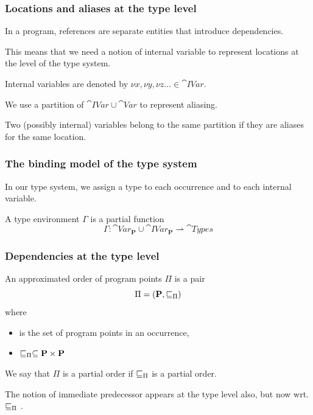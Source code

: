 \documentclass{beamer}
\begin{document}
 \begin{frame}
   \frametitle{Locations and aliases at the type level}

In a program, references are separate entities that introduce
dependencies.

This means that we need a notion of \alert{internal variable} to
represent locations at the level of the type system.

Internal variables are denoted by
$\nu x,\nu y, \nu z \ldots \in\cat{IVar}$.

We use a partition of $\cat{IVar} \cup \cat{Var}$ to represent
aliasing.

Two (possibly internal) variables belong to the same partition if they are
aliases for the same location.


 \end{frame}
 
 \begin{frame}
   \frametitle{The binding model of the type system}

   In our type system, we assign a type to each occurrence and to each
   internal variable.

   A type environment $\Gamma$ is a partial function
   \[
     \Gamma:\cat{Var}_{\mathbf{P}}\cup\cat{IVar}_{\mathbf{P}}\rightharpoonup\cat{Types} \]
   
 \end{frame}

 \begin{frame}
   \frametitle{Dependencies at the type level}

	An approximated order of program points $\Pi$ is a pair
	\[ \Pi=(\textbf{P},\sqsubseteq_\Pi) \]
	where
	\begin{itemize}
		\item {} is the set of program points in an occurrence,
		\item $\sqsubseteq_\Pi\subseteq\textbf{P}\times\textbf{P}$
	\end{itemize}
	We say that $\Pi$ is a partial order if $\sqsubseteq_\Pi$ is a partial order.

        The notion of immediate predecessor appears at the type level also,
        but now wrt. $\sqsubseteq_\Pi$ .
        
      \end{frame}
\end{document}
